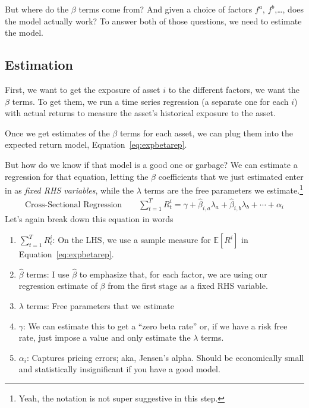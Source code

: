 \documentclass[12pt]{article}
\theoremstyle{plain}
\theoremstyle{definition}
\theoremstyle{remark}
\begin{document}
But where do the $\beta$ terms come from? And given a choice of factors
$f^a$, $f^b$,\ldots, does the model actually work? To answer both of
those questions, we need to estimate the model.

\subsection{Estimation}

First, we want to get the exposure of asset $i$ to the different
factors, we want the $\beta$ terms. To get them, we run a time series
regression (a separate one for each $i$) with actual returns to measure
the asset's historical exposure to the asset.

Once we get estimates of the $\beta$ terms for each asset, we can plug
them into the expected return model, Equation~\ref{eq:expbetarep}.

But how do we know if that model is a good one or garbage? We can
estimate a regression for that equation, letting the $\beta$
coefficients that we just estimated enter in as \emph{fixed RHS
variables}, while the $\lambda$ terms are the free parameters we
estimate.\footnote{Yeah, the notation is not super suggestive in this
step.}
\begin{align}
  \text{Cross-Sectional Regression}\qquad
  \sum^T_{t=1} R^i_t = \gamma + \hat{\beta}_{i,a} \lambda_a
  + \hat{\beta}_{i,b} \lambda_b + \cdots
  + \alpha_i
\end{align}
Let's again break down this equation in words
\begin{enumerate}
  \item $\sum^T_{t=1} R^i_t$: On the LHS, we use a sample measure
    for $\mathbb{E}[R^i]$ in Equation~\ref{eq:expbetarep}.
  \item $\hat{\beta}$ terms: I use $\hat{\beta}$ to emphasize that, for
    each factor, we are using our regression estimate of $\beta$ from
    the first stage as a fixed RHS variable.
  \item $\lambda$ terms: Free parameters that we estimate
  \item $\gamma$: We can estimate this to get a ``zero beta rate''
    or, if we have a risk free rate, just impose a value and only
    estimate the $\lambda$ terms.
  \item $\alpha_i$: Captures pricing errors; aka, Jensen's alpha. Should
    be economically small and statistically insignificant if you have a
    good model.
\end{enumerate}
\end{document}
